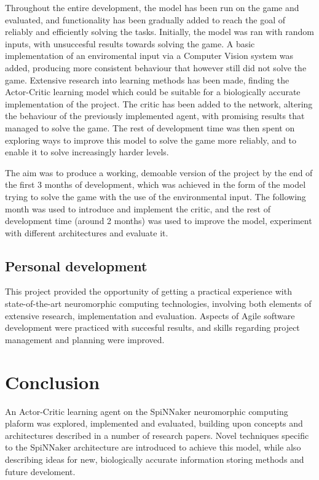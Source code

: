 \documentclass[10pt]{article}
\begin{document}
    Throughout the entire development, the model has been run on the game and evaluated, and functionality has been gradually added to reach the goal of reliably and efficiently solving the tasks. Initially, the model was ran with random inputs, with unsuccesful results towards solving the game. A basic implementation of an enviromental input via a Computer Vision system was added, producing more consistent behaviour that however still did not solve the game. Extensive research into learning methods has been made, finding the Actor-Critic learning model which could be suitable for a biologically accurate implementation of the project. The critic has been added to the network, altering the behaviour of the previously implemented agent, with promising results that managed to solve the game. The rest of development time was then spent on exploring ways to improve this model to solve the game more reliably, and to enable it to solve increasingly harder levels.

    The aim was to produce a working, demoable version of the project by the end of the first 3 months of development, which was achieved in the form of the model trying to solve the game with the use of the environmental input. The following month was used to introduce and implement the critic, and the rest of development time (around 2 months) was used to improve the model, experiment with different architectures and evaluate it.

    \subsection{Personal development}

    This project provided the opportunity of getting a practical experience with state-of-the-art neuromorphic computing technologies, involving both elements of extensive research, implementation and evaluation. Aspects of Agile software development were practiced with succesful results, and skills regarding project management and planning were improved.
    
    \section{Conclusion}

    An Actor-Critic learning agent on the SpiNNaker neuromorphic computing plaform was explored, implemented and evaluated, building upon concepts and architectures described in a number of research papers. Novel techniques specific to the SpiNNaker architecture are introduced to achieve this model, while also describing ideas for new, biologically accurate information storing methods and future develoment.
\end{document}
